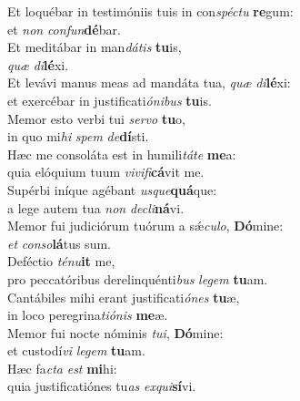 \evenverse Et loquébar in testimóniis tuis in con\textit{spé}\textit{ctu} \textbf{re}gum:~\*\\
\evenverse et \textit{non} \textit{con}\textit{fun}\textbf{dé}bar.\\
\oddverse Et meditábar in man\textit{dá}\textit{tis} \textbf{tu}is,~\*\\
\oddverse \textit{quæ} \textit{di}\textbf{lé}xi.\\
\evenverse Et levávi manus meas ad mandáta tua, \textit{quæ} \textit{di}\textbf{lé}xi:~\*\\
\evenverse et exercébar in justificati\textit{ó}\textit{ni}\textit{bus} \textbf{tu}is.\\
\oddverse Memor esto verbi tui \textit{ser}\textit{vo} \textbf{tu}o,~\*\\
\oddverse in quo mi\textit{hi} \textit{spem} \textit{de}\textbf{dí}sti.\\
\evenverse Hæc me consoláta est in humili\textit{tá}\textit{te} \textbf{me}a:~\*\\
\evenverse quia elóquium tuum \textit{vi}\textit{vi}\textit{fi}\textbf{cá}vit me.\\
\oddverse Supérbi iníque agébant \textit{us}\textit{que}\textbf{quá}que:~\*\\
\oddverse a lege autem tua \textit{non} \textit{de}\textit{cli}\textbf{ná}vi.\\
\evenverse Memor fui judiciórum tuórum a sǽ\textit{cu}\textit{lo}, \textbf{Dó}mine:~\*\\
\evenverse \textit{et} \textit{con}\textit{so}\textbf{lá}tus sum.\\
\oddverse Deféctio \textit{té}\textit{nu}\textbf{it} me,~\*\\
\oddverse pro peccatóribus derelinquénti\textit{bus} \textit{le}\textit{gem} \textbf{tu}am.\\
\evenverse Cantábiles mihi erant justificati\textit{ó}\textit{nes} \textbf{tu}æ,~\*\\
\evenverse in loco peregrina\textit{ti}\textit{ó}\textit{nis} \textbf{me}æ.\\
\oddverse Memor fui nocte nóminis \textit{tu}\textit{i}, \textbf{Dó}mine:~\*\\
\oddverse et custodí\textit{vi} \textit{le}\textit{gem} \textbf{tu}am.\\
\evenverse Hæc fa\textit{cta} \textit{est} \textbf{mi}hi:~\*\\
\evenverse quia justificatiónes tu\textit{as} \textit{ex}\textit{qui}\textbf{sí}vi.\\
